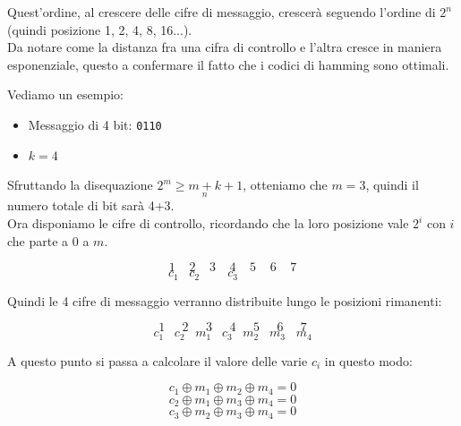 Quest'ordine, al crescere delle cifre di messaggio, crescerà seguendo l'ordine di $2^n$ (quindi posizione 1, 2, 4, 8, 16...).\\
Da notare come la distanza fra una cifra di controllo e l'altra cresce in maniera esponenziale, questo a confermare il fatto che i codici di hamming sono ottimali.

Vediamo un esempio:
\begin{itemize}
	\item Messaggio di 4 bit: \texttt{0110}
	\item $k=4$
\end{itemize}
Sfruttando la disequazione $2^m \geq \underset{n}{m+k}+1$, otteniamo che $m=3$, quindi il numero totale di bit sarà 4+3.\\
Ora disponiamo le cifre di controllo, ricordando che la loro posizione vale $2^i$ con $i$ che parte a 0 a $m$.

\begin{equation*}
1 \; \; \; \; 2 \; \; \; \; 3  \; \; \; \; 4  \; \; \; \; 5  \; \; \; \; 6  \; \; \; \; 7
\end{equation*}
\begin{equation*}
c_1 \; \;  \; c_2 \; \; \; \; \;  \; \; \; c_3  \; \; \; \; \; \; \; \; \; \; \; \; \; \; \; \; \; 
\end{equation*}

Quindi le 4 cifre di messaggio verranno distribuite lungo le posizioni rimanenti:

\begin{equation*}
1 \; \; \; \; \; 2 \; \; \; \; \; 3  \; \; \; \; \; 4  \; \; \; \; \; 5  \; \; \; \; \; 6  \; \; \; \; \; 7
\end{equation*}
\begin{equation*}
c_1 \; \; \; c_2 \; \; \; m_1 \; \; \;  c_3  \; \; \; m_2 \; \; \; m_3 \; \; \; m_4
\end{equation*}

A questo punto si passa a calcolare il valore delle varie $c_i$ in questo modo:

\begin{equation*}
c_1 \oplus m_1 \oplus m_2 \oplus m_4 = 0
\end{equation*}
\begin{equation*}
c_2 \oplus m_1 \oplus m_3 \oplus m_4 = 0
\end{equation*}
\begin{equation*}
c_3 \oplus m_2 \oplus m_3 \oplus m_4 = 0
\end{equation*}

